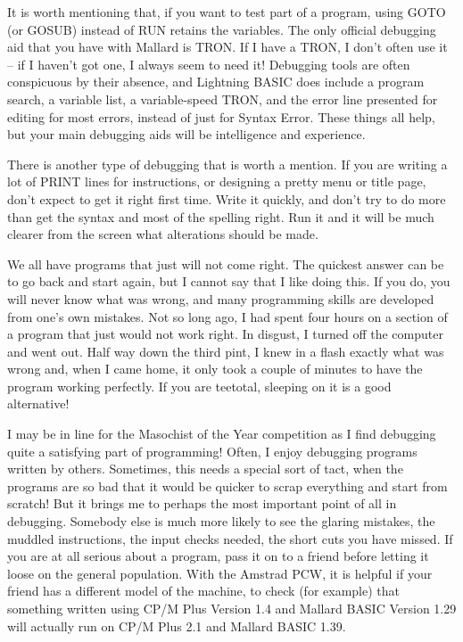 It is worth mentioning that, if you want to test part of a program, using GOTO 
(or  GOSUB) instead of RUN retains the variables. The only official  debugging 
aid that you have with Mallard is TRON. If I have a TRON, I don't often use it 
--  if I haven't got one, I always seem to need it! Debugging tools are  often 
conspicuous  by  their  absence, and Lightning BASIC does  include  a  program 
search,  a variable list, a variable-speed TRON, and the error line  presented 
for  editing for most errors, instead of just for Syntax Error.  These  things 
all help, but your main debugging aids will be intelligence and experience.

There is another type of debugging that is worth a mention. If you are writing 
a  lot  of PRINT lines for instructions, or designing a pretty menu  or  title 
page, don't expect to get it right first time. Write it quickly, and don't try 
to  do more than get the syntax and most of the spelling right. Run it and  it 
will be much clearer from the screen what alterations should be made.

We all have programs that just will not come right. The quickest answer can be 
to  go back and start again, but I cannot say that I like doing this.  If  you 
do,  you  will  never know what was wrong, and  many  programming  skills  are 
developed from one's own mistakes. Not so long ago, I had spent four hours  on 
a  section of a program that just would not work right. In disgust,  I  turned 
off the computer and went out. Half way down the third pint, I knew in a flash 
exactly what was wrong and, when I came home, it only took a couple of minutes 
to have the program working perfectly. If you are teetotal, sleeping on it  is 
a good alternative!

I may be in line for the Masochist of the Year competition as I find debugging 
quite  a  satisfying part of programming! Often, I  enjoy  debugging  programs 
written  by  others. Sometimes, this needs a special sort of  tact,  when  the 
programs  are  so bad that it would be quicker to scrap everything  and  start 
from  scratch! But it brings me to perhaps the most important point of all  in 
debugging. Somebody else is much more likely to see the glaring mistakes,  the 
muddled instructions, the input checks needed, the short cuts you have missed. 
If  you  are  at all serious about a program, pass it on to  a  friend  before 
letting  it  loose  on the general population. With the  Amstrad  PCW,  it  is 
helpful  if  your friend has a different model of the machine, to  check  (for 
example) that something written using CP/M Plus Version 1.4 and Mallard  BASIC 
Version 1.29 will actually run on CP/M Plus 2.1 and Mallard BASIC 1.39.


